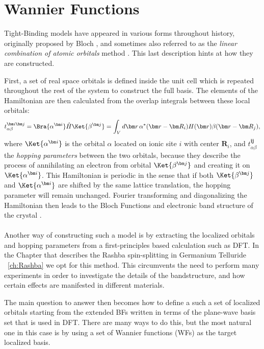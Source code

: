 \chapter{Wannier Functions \label{sec:Wannier}}
Tight-Binding models have appeared in various forms throughout history, originally proposed by Bloch \cite{Bloch1929}, and sometimes also referred to as the {\it linear combination of atomic orbitals} method \cite{Slater1954}.
This last description hints at how they are constructed.

First, a set of real space orbitals is defined inside the unit cell which is repeated throughout the rest of the system to construct the full basis.
The elements of the Hamiltonian are then calculated from the overlap integrals between these local orbitals:
\begin{equation}
	t^{\bm i \bm j}_{\alpha \beta} = \Bra{\alpha^{\bm i}} \hat{H} \Ket{\beta^{\bm j}} = \int_{V} d\bm r\, \alpha^*(\bm r - \bm R_i) H(\bm r) \beta(\bm r - \bm R_j),
\end{equation}
where $\Ket{\alpha^{\bm i}}$ is the orbital $\alpha$ located on ionic site $i$ with center $\bm R_i$, and $t^{\bm i \bm j}_{\alpha \beta}$ the {\it hopping parameters} between the two orbitals, because they describe the process of annihilating an electron from orbital $\Ket{\beta^{\bm j}}$ and creating it on $\Ket{\alpha^{\bm i}}$.
This Hamiltonian is periodic in the sense that if both $\Ket{\beta^{\bm j}}$ and $\Ket{\alpha^{\bm i}}$ are shifted by the same lattice translation, the hopping parameter will remain unchanged.
Fourier transforming and diagonalizing the Hamiltonian then leads to the Bloch Functions and electronic band structure of the crystal \cite{Ashcroft}.
\\\\
Another way of constructing such a model is by extracting the localized orbitals and hopping parameters from a first-principles based calculation such as DFT. In the Chapter that describes the Rashba spin-splitting in Germanium Telluride ~\ref{ch:Rashba} we opt for this method.
This circumvents the need to perform many experiments in order to investigate the details of the bandstructure, and how certain effects are manifested in different materials. 

The main question to answer then becomes how to define a such a set of localized orbitals starting from the extended BFs written in terms of the plane-wave basis set that is used in DFT.
There are many ways to do this, but the most natural one in this case is by using a set of Wannier functions (WFs) \cite{Wannier1937} as the target localized basis.

